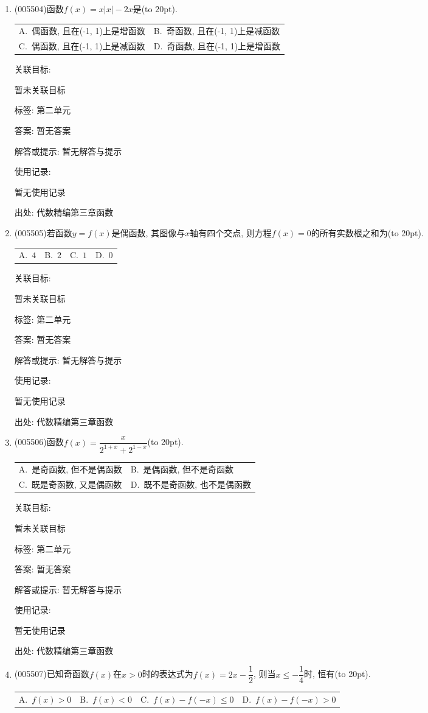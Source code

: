 \documentclass[10pt,a4paper]{article}
\newcommand{\bracket}[1]{(\hbox to #1pt{})}
\newcommand{\twoch}[4]{\par\begin{tabular}{p{.46\textwidth}p{.46\textwidth}}
A.~#1& B.~#2\\
C.~#3& D.~#4
\end{tabular}}
\newcommand{\fourch}[4]{\par\begin{tabular}{p{.23\textwidth}p{.23\textwidth}p{.23\textwidth}p{.23\textwidth}}
A.~#1 &B.~#2& C.~#3& D.~#4
\end{tabular}}
\begin{document}
\begin{enumerate}[1.]
关联目标:

暂未关联目标



标签: 第二单元

答案: 暂无答案

解答或提示: 暂无解答与提示

使用记录:

暂无使用记录


出处: 代数精编第三章函数
\item { (005504)}函数$f(x)=x|x|-2x$是\bracket{20}.
\twoch{偶函数, 且在(-1, 1)上是增函数}{奇函数, 且在(-1, 1)上是减函数}{偶函数, 且在(-1, 1)上是减函数}{奇函数, 且在(-1, 1)上是增函数}


关联目标:

暂未关联目标



标签: 第二单元

答案: 暂无答案

解答或提示: 暂无解答与提示

使用记录:

暂无使用记录


出处: 代数精编第三章函数
\item { (005505)}若函数$y=f(x)$是偶函数, 其图像与$x$轴有四个交点, 则方程$f(x)=0$的所有实数根之和为\bracket{20}.
\fourch{$4$}{$2$}{$1$}{$0$}


关联目标:

暂未关联目标



标签: 第二单元

答案: 暂无答案

解答或提示: 暂无解答与提示

使用记录:

暂无使用记录


出处: 代数精编第三章函数
\item { (005506)}函数$f(x)=\dfrac x{2^{1+x}+2^{1-x}}$\bracket{20}.
\twoch{是奇函数, 但不是偶函数}{是偶函数, 但不是奇函数}{既是奇函数, 又是偶函数}{既不是奇函数, 也不是偶函数}


关联目标:

暂未关联目标



标签: 第二单元

答案: 暂无答案

解答或提示: 暂无解答与提示

使用记录:

暂无使用记录


出处: 代数精编第三章函数
\item { (005507)}已知奇函数$f(x)$在$x>0$时的表达式为$f(x)=2x-\dfrac 12$, 则当$x\le -\dfrac 14$时, 恒有\bracket{20}.
\fourch{$f(x)>0$}{$f(x)<0$}{$f(x)-f(-x)\le 0$}{$f(x)-f(-x)>0$}



\end{enumerate}
\end{document}
